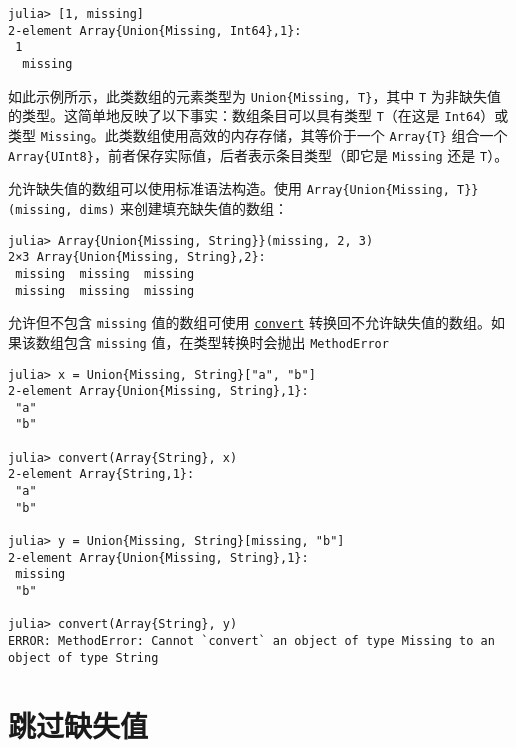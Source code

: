 \begin{verbatim}
julia> [1, missing]
2-element Array{Union{Missing, Int64},1}:
 1
  missing
\end{verbatim}



如此示例所示，此类数组的元素类型为 \texttt{Union\{Missing, T\}}，其中 \texttt{T} 为非缺失值的类型。这简单地反映了以下事实：数组条目可以具有类型 \texttt{T}（在这是 \texttt{Int64}）或类型 \texttt{Missing}。此类数组使用高效的内存存储，其等价于一个 \texttt{Array\{T\}} 组合一个 \texttt{Array\{UInt8\}}，前者保存实际值，后者表示条目类型（即它是 \texttt{Missing} 还是 \texttt{T}）。



允许缺失值的数组可以使用标准语法构造。使用 \texttt{Array\{Union\{Missing, T\}\}(missing, dims)} 来创建填充缺失值的数组：




\begin{verbatim}
julia> Array{Union{Missing, String}}(missing, 2, 3)
2×3 Array{Union{Missing, String},2}:
 missing  missing  missing
 missing  missing  missing
\end{verbatim}



允许但不包含 \texttt{missing} 值的数组可使用 \hyperlink{1846942650946171605}{\texttt{convert}} 转换回不允许缺失值的数组。如果该数组包含 \texttt{missing} 值，在类型转换时会抛出 \texttt{MethodError}




\begin{verbatim}
julia> x = Union{Missing, String}["a", "b"]
2-element Array{Union{Missing, String},1}:
 "a"
 "b"

julia> convert(Array{String}, x)
2-element Array{String,1}:
 "a"
 "b"

julia> y = Union{Missing, String}[missing, "b"]
2-element Array{Union{Missing, String},1}:
 missing
 "b"

julia> convert(Array{String}, y)
ERROR: MethodError: Cannot `convert` an object of type Missing to an object of type String
\end{verbatim}



\hypertarget{12164012210983849465}{}


\section{跳过缺失值}



